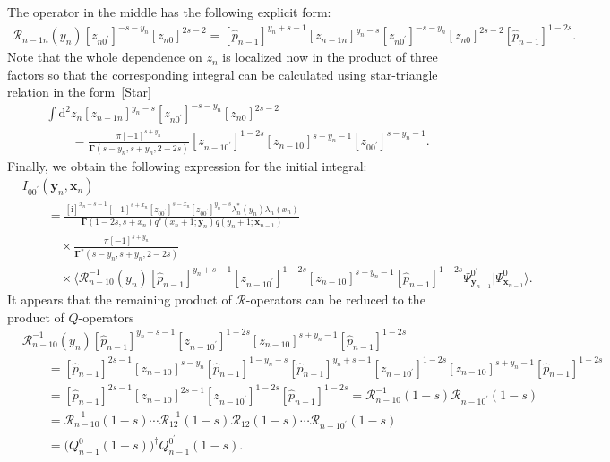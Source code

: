 \documentclass[10pt,a4paper]{amsart}
\renewcommand{\imath}{\mathrm{i}}
\numberwithin{equation}{section}
\begin{document}
The operator in the middle has the following explicit form:
\begin{gather*}
\mathcal{R}_{n-1 n}(y_n)
[z_{n 0^{\prime}}]^{-s-y_n} [z_{n0}]^{2s-2} =
[\hat{p}_{n-1}]^{y_n+s-1} [z_{n-1 n}]^{y_n-s}
[z_{n 0^{\prime}}]^{-s-y_n} [z_{n0}]^{2s-2}
[\hat{p}_{n-1}]^{1-2s}.
\end{gather*}
Note that the whole dependence on $z_n$ is localized now
in the product of three factors so that the
corresponding integral can be calculated using
star-triangle relation in the form~\eqref{Star}
\begin{align*}
&
\int \mathrm{d}^2 z_n [z_{n-1 n}]^{y_n-s}
[z_{n 0^{\prime}}]^{-s-y_n} [z_{n0}]^{2s-2} \\
& \qquad =
\frac{\pi [-1]^{s+y_n}}{\mathbf{\Gamma}(s-y_n,s+y_n,2-2s)}
[z_{n-1 0^{\prime}}]^{1-2s} [z_{n-1 0}]^{s+y_n-1} [z_{0 0^{\prime}}]^{s-y_n-1} .
\end{align*}
Finally, we obtain the following expression for the initial integral:
\begin{align*}
&
I_{0 0^{\prime}}(\bm{y}_n,\bm{x}_{n}) \\
& \qquad =
\frac{[\imath]^{x_n-s-1} [-1]^{s+x_n} [z_{0 0^{\prime}}]^{s-x_n}
[z_{0 0^{\prime}}]^{y_n-s} \lambda_n^\ast(y_n) \lambda_n(x_n)}
{\mathbf{\Gamma}(1-2s,s+x_n) q^{*}(x_n+1;\bm{y}_n) q(y_n+1;\bm{x}_{n-1})} \\
& \qquad\quad \times
\frac{\pi [-1]^{s+y_n}}{\mathbf{\Gamma}^{*}(s-y_n,s+y_n,2-2s)} \\
& \qquad\quad \times
\bigl\langle \mathcal{R}^{-1}_{n-1 0}(y_n)
[\hat{p}_{n-1}]^{y_n+s-1}
[z_{n-1 0^{\prime}}]^{1-2s} [z_{n-1 0}]^{s+y_n-1}
 [\hat{p}_{n-1}]^{1-2s} \Psi^{0^{\prime}}_{\bm{y}_{n-1}}|
\Psi^{0}_{\bm{x}_{n-1}}\bigr\rangle .
\end{align*}
It appears that the remaining product of $\mathcal{R}$-operators
can be reduced to the product of $Q$-operators
\begin{align*}
&
\mathcal{R}^{-1}_{n-1 0}(y_n)
[\hat{p}_{n-1}]^{y_n+s-1}
[z_{n-1 0^{\prime}}]^{1-2s} [z_{n-1 0}]^{s+y_n-1}
 [\hat{p}_{n-1}]^{1-2s} \\
&\qquad{} =
[\hat{p}_{n-1}]^{2s-1}
[z_{n-1 0}]^{s-y_n}
[\hat{p}_{n-1}]^{1-y_n-s}
[\hat{p}_{n-1}]^{y_n+s-1}
[z_{n-1 0^{\prime}}]^{1-2s} [z_{n-1 0}]^{s+y_n-1}
 [\hat{p}_{n-1}]^{1-2s} \\
&\qquad{} =
[\hat{p}_{n-1}]^{2s-1}
[z_{n-1 0}]^{2s-1}
[z_{n-1 0^{\prime}}]^{1-2s}
 [\hat{p}_{n-1}]^{1-2s} =
\mathcal{R}^{-1}_{n-1 0}(1-s) \mathcal{R}_{n-1 0^{\prime}}(1-s) \\
&\qquad{} =
\mathcal{R}^{-1}_{n-1 0}(1-s)\cdots
\mathcal{R}^{-1}_{12}(1-s)
\mathcal{R}_{12}(1-s)\cdots\mathcal{R}_{n-1 0^{\prime}}(1-s) \\
&\qquad{} =
\bigl(Q^{0}_{n-1}(1-s)\bigr)^{\dagger} Q^{0^{\prime}}_{n-1}(1-s) .
\end{align*}
\end{document}
